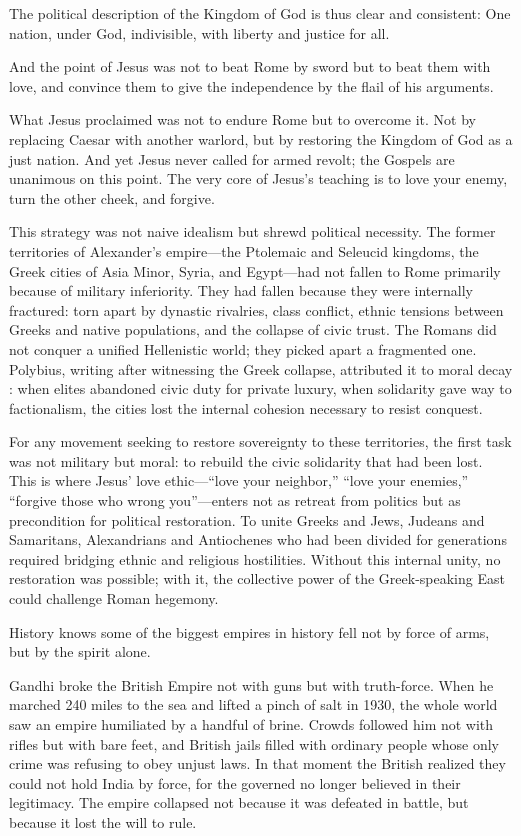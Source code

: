 The political description of the Kingdom of God is thus clear and consistent:
One nation, under God, indivisible, with liberty and justice for all.

And the point of Jesus was not to beat Rome by sword but to beat them with love,
and convince them to give the independence by the flail of his arguments.

What Jesus proclaimed was not to endure Rome but to overcome it.
Not by replacing Caesar with another warlord, but by restoring the Kingdom of God as a just nation.
And yet Jesus never called for armed revolt; the Gospels are unanimous on this point.
The very core of Jesus's teaching is to love your enemy, turn the other cheek, and forgive.

This strategy was not naive idealism but shrewd political necessity.
The former territories of Alexander's empire---the Ptolemaic and Seleucid kingdoms, the Greek cities of Asia Minor, Syria, and Egypt---had not fallen to Rome primarily because of military inferiority.
They had fallen because they were internally fractured: torn apart by dynastic rivalries, class conflict, ethnic tensions between Greeks and native populations, and the collapse of civic trust.
The Romans did not conquer a unified Hellenistic world; they picked apart a fragmented one.
Polybius, writing after witnessing the Greek collapse, attributed it to moral decay \cite{polybius:histories}: when elites abandoned civic duty for private luxury, when solidarity gave way to factionalism, the cities lost the internal cohesion necessary to resist conquest.

For any movement seeking to restore sovereignty to these territories, the first task was not military but moral: to rebuild the civic solidarity that had been lost.
This is where Jesus' love ethic---``love your neighbor,'' ``love your enemies,'' ``forgive those who wrong you''---enters not as retreat from politics but as precondition for political restoration.
To unite Greeks and Jews, Judeans and Samaritans, Alexandrians and Antiochenes who had been divided for generations required bridging ethnic and religious hostilities.
Without this internal unity, no restoration was possible; with it, the collective power of the Greek-speaking East could challenge Roman hegemony.

History knows some of the biggest empires in history fell not by force of arms, but by the spirit alone.

Gandhi broke the British Empire not with guns but with truth-force.
When he marched 240 miles to the sea and lifted a pinch of salt in 1930, the whole world saw an empire humiliated by a handful of brine.
Crowds followed him not with rifles but with bare feet, and British jails filled with ordinary people whose only crime was refusing to obey unjust laws.
In that moment the British realized they could not hold India by force, for the governed no longer believed in their legitimacy.
The empire collapsed not because it was defeated in battle, but because it lost the will to rule.

